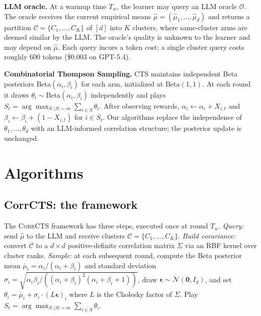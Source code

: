 \documentclass{article}
\theoremstyle{plain}
\theoremstyle{definition}
\theoremstyle{remark}
\newcommand{\CorrCTS}{\textsc{CorrCTS}}
\begin{document}
\textbf{LLM oracle.}
At a warmup time $T_w$, the learner may query an LLM oracle $\mathcal{O}$.
The oracle receives the current empirical means $\hat\mu = (\hat\mu_1, \ldots, \hat\mu_d)$ and returns a partition $\mathcal{C} = \{C_1, \ldots, C_K\}$ of $[d]$ into $K$ clusters, where same-cluster arms are deemed similar by the LLM.
The oracle's quality is unknown to the learner and may depend on $\hat\mu$.
Each query incurs a token cost; a single cluster query costs roughly 600 tokens (\$0.003 on GPT-5.4).

\textbf{Combinatorial Thompson Sampling.}
CTS \citep{wang2018cts} maintains independent Beta posteriors $\text{Beta}(\alpha_i, \beta_i)$ for each arm, initialized at $\text{Beta}(1,1)$.
At each round it draws $\theta_i \sim \text{Beta}(\alpha_i, \beta_i)$ independently and plays $S_t = \arg\max_{S:|S|=m} \sum_{i \in S} \theta_i$.
After observing rewards, $\alpha_i \leftarrow \alpha_i + X_{i,t}$ and $\beta_i \leftarrow \beta_i + (1 - X_{i,t})$ for $i \in S_t$.
Our algorithms replace the independence of $\theta_1, \ldots, \theta_d$ with an LLM-informed correlation structure; the posterior update is unchanged.

\section{Algorithms}\label{sec:algorithms}

\subsection{CorrCTS: the framework}\label{sec:corr-framework}

The \CorrCTS{} framework has three steps, executed once at round $T_w$.
\emph{Query:} send $\hat\mu$ to the LLM and receive clusters $\mathcal{C} = \{C_1, \ldots, C_K\}$.
\emph{Build covariance:} convert $\mathcal{C}$ to a $d \times d$ positive-definite correlation matrix $\Sigma$ via an RBF kernel over cluster ranks.
\emph{Sample:} at each subsequent round, compute the Beta posterior mean $\bar\mu_i = \alpha_i/(\alpha_i+\beta_i)$ and standard deviation $\sigma_i = \sqrt{\alpha_i \beta_i / ((\alpha_i + \beta_i)^2 (\alpha_i + \beta_i + 1))}$, draw $\boldsymbol{\epsilon} \sim \mathcal{N}(\mathbf{0}, I_d)$, and set $\theta_i = \bar\mu_i + \sigma_i \cdot (L \boldsymbol{\epsilon})_i$ where $L$ is the Cholesky factor of $\Sigma$.
Play $S_t = \arg\max_{S:|S|=m} \sum_{i \in S} \theta_i$.
\end{document}
